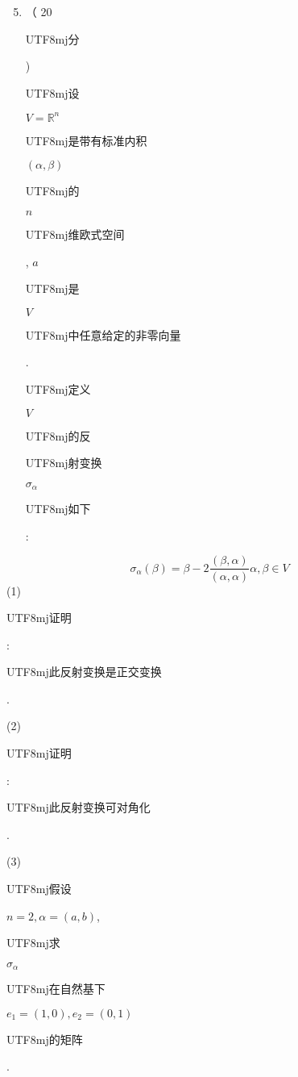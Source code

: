 \documentclass[10pt]{article}
\begin{document}
\begin{enumerate}
  \setcounter{enumi}{4}
  \item （ 20 \begin{CJK}{UTF8}{mj}分\end{CJK}) \begin{CJK}{UTF8}{mj}设\end{CJK} $V=\mathbb{R}^{n}$ \begin{CJK}{UTF8}{mj}是带有标准内积\end{CJK} $(\alpha, \beta)$ \begin{CJK}{UTF8}{mj}的\end{CJK} $n$ \begin{CJK}{UTF8}{mj}维欧式空间\end{CJK}, $a$ \begin{CJK}{UTF8}{mj}是\end{CJK} $V$ \begin{CJK}{UTF8}{mj}中任意给定的非零向量\end{CJK}. \begin{CJK}{UTF8}{mj}定义\end{CJK} $V$ \begin{CJK}{UTF8}{mj}的反\end{CJK} \begin{CJK}{UTF8}{mj}射变换\end{CJK} $\sigma_{\alpha}$ \begin{CJK}{UTF8}{mj}如下\end{CJK}:
\end{enumerate}
$$
\sigma_{\alpha}(\beta)=\beta-2 \frac{(\beta, \alpha)}{(\alpha, \alpha)} \alpha, \beta \in V
$$
(1) \begin{CJK}{UTF8}{mj}证明\end{CJK}: \begin{CJK}{UTF8}{mj}此反射变换是正交变换\end{CJK}.

(2) \begin{CJK}{UTF8}{mj}证明\end{CJK}: \begin{CJK}{UTF8}{mj}此反射变换可对角化\end{CJK}.

(3) \begin{CJK}{UTF8}{mj}假设\end{CJK} $n=2, \alpha=(a, b)$, \begin{CJK}{UTF8}{mj}求\end{CJK} $\sigma_{\alpha}$ \begin{CJK}{UTF8}{mj}在自然基下\end{CJK} $e_{1}=(1,0), e_{2}=(0,1)$ \begin{CJK}{UTF8}{mj}的矩阵\end{CJK}.
\end{document}
